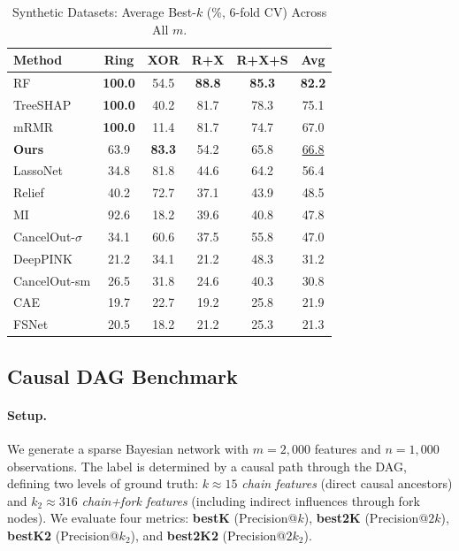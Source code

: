 \documentclass{uai2026} %
\theoremstyle{definition}
\theoremstyle{remark}
\begin{document}
\begin{table}[t]
    \centering
    \caption{Synthetic Datasets: Average Best-$k$ (\%, 6-fold CV) Across All $m$.}\label{tab:synthetic}
    \begin{tabular}{lcccc|c}
        \toprule
        \textbf{Method} & \textbf{Ring} & \textbf{XOR} & \textbf{R+X} & \textbf{R+X+S} & \textbf{Avg} \\
        \midrule
        RF          & \textbf{100.0} & 54.5 & \textbf{88.8} & \textbf{85.3} & \textbf{82.2} \\
        TreeSHAP    & \textbf{100.0} & 40.2 & 81.7 & 78.3 & 75.1 \\
        mRMR        & \textbf{100.0} & 11.4 & 81.7 & 74.7 & 67.0 \\
        \textbf{Ours}  & 63.9 & \textbf{83.3} & 54.2 & 65.8 & \underline{66.8} \\
        LassoNet    & 34.8 & 81.8 & 44.6 & 64.2 & 56.4 \\
        Relief      & 40.2 & 72.7 & 37.1 & 43.9 & 48.5 \\
        MI          & 92.6 & 18.2 & 39.6 & 40.8 & 47.8 \\
        CancelOut-$\sigma$ & 34.1 & 60.6 & 37.5 & 55.8 & 47.0 \\
        DeepPINK    & 21.2 & 34.1 & 21.2 & 48.3 & 31.2 \\
        CancelOut-sm & 26.5 & 31.8 & 24.6 & 40.3 & 30.8 \\
        CAE         & 19.7 & 22.7 & 19.2 & 25.8 & 21.9 \\
        FSNet       & 20.5 & 18.2 & 21.2 & 25.3 & 21.3 \\
        \bottomrule
    \end{tabular}
\end{table}

\subsection{Causal DAG Benchmark}\label{sec:dag}

\paragraph{Setup.}
We generate a sparse Bayesian network with $m{=}2{,}000$ features and $n{=}1{,}000$ observations.
The label is determined by a causal path through the DAG, defining two levels of ground truth:
$k \approx 15$ \emph{chain features} (direct causal ancestors) and $k_2 \approx 316$ \emph{chain+fork features} (including indirect influences through fork nodes).
We evaluate four metrics: \textbf{bestK} (Precision@$k$), \textbf{best2K} (Precision@$2k$), \textbf{bestK2} (Precision@$k_2$), and \textbf{best2K2} (Precision@$2k_2$).
\end{document}
